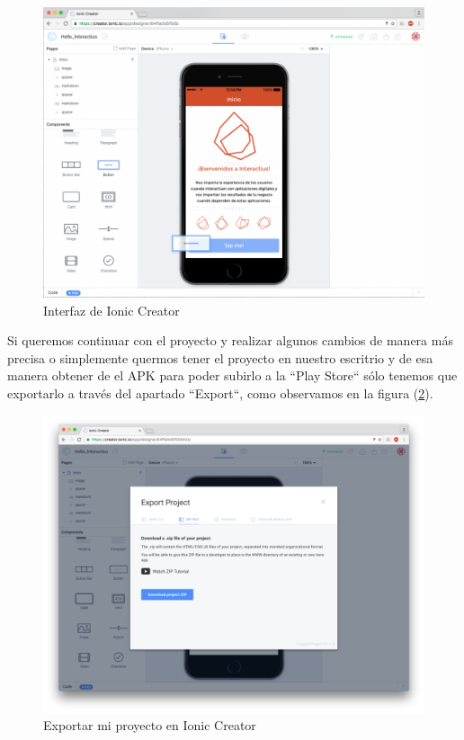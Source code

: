 \documentclass[a4paper, 11pt]{article}
\begin{document}
\begin{itemize}
                \begin{figure}[H]
                  \centering
                       \includegraphics[width=\textwidth]{creator3}
                       \caption{Interfaz de Ionic Creator}
                       \label{f:creator3}
                 \end{figure}

                 Si queremos continuar con el proyecto y realizar algunos cambios
                 de manera más precisa o simplemente quermos tener el proyecto en
                 nuestro escritrio y de esa manera obtener de el APK para poder
                 subirlo a la ``Play Store`` sólo tenemos que exportarlo a través
                 del apartado ``Export``, como observamos en la figura
                 (\ref{f:creator4}).\\

                 \begin{figure}[H]
                   \centering
                        \includegraphics[width=\textwidth]{creator4}
                        \caption{Exportar mi proyecto en Ionic Creator}
                        \label{f:creator4}
                  \end{figure}


\end{itemize}
\end{document}
